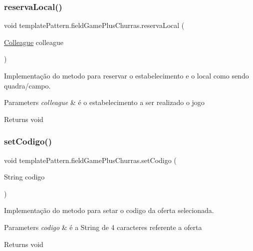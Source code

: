 \subsubsection{\texorpdfstring{reservaLocal()}{reservaLocal()}}
{\footnotesize\ttfamily void template\+Pattern.\+field\+Game\+Plus\+Churras.\+reserva\+Local (\begin{DoxyParamCaption}\item[{\mbox{\hyperlink{classmediator_pattern_1_1_colleague}{Colleague}}}]{colleague }\end{DoxyParamCaption})}



Implementação do metodo para reservar o estabelecimento e o local como sendo quadra/campo. 


\begin{DoxyParams}{Parameters}
{\em colleague} & é o estabelecimento a ser realizado o jogo \\
\hline
\end{DoxyParams}
\begin{DoxyReturn}{Returns}
void 
\end{DoxyReturn}
\mbox{\label{classtemplate_pattern_1_1field_game_plus_churras_a8ece9ec42a83873fccdef916c6627165}} 
\subsubsection{\texorpdfstring{setCodigo()}{setCodigo()}}
{\footnotesize\ttfamily void template\+Pattern.\+field\+Game\+Plus\+Churras.\+set\+Codigo (\begin{DoxyParamCaption}\item[{String}]{codigo }\end{DoxyParamCaption})}



Implementação do metodo para setar o codigo da oferta selecionada. 


\begin{DoxyParams}{Parameters}
{\em codigo} & é a String de 4 caracteres referente a oferta \\
\hline
\end{DoxyParams}
\begin{DoxyReturn}{Returns}
void 
\end{DoxyReturn}
\mbox{\label{classtemplate_pattern_1_1field_game_plus_churras_aa1aec264b7b0933cfd073d9fe00ddbec}} 
